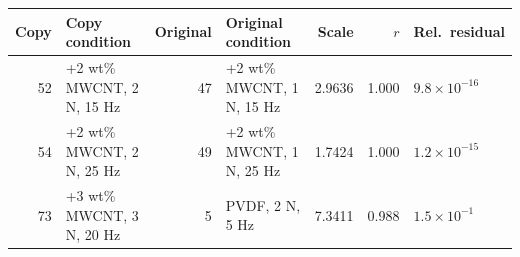 \begin{tabular}{rlrlrrl}
\toprule
Copy & Copy condition & Original & Original condition & Scale & $r$ & Rel.\ residual \\
\midrule
52 & +2 wt\% MWCNT, 2 N, 15 Hz & 47 & +2 wt\% MWCNT, 1 N, 15 Hz & 2.9636 & 1.000 & $9.8\times10^{-16}$ \\
54 & +2 wt\% MWCNT, 2 N, 25 Hz & 49 & +2 wt\% MWCNT, 1 N, 25 Hz & 1.7424 & 1.000 & $1.2\times10^{-15}$ \\
73 & +3 wt\% MWCNT, 3 N, 20 Hz & 5 & PVDF, 2 N, 5 Hz & 7.3411 & 0.988 & $1.5\times10^{-1}$ \\
\bottomrule
\end{tabular}
